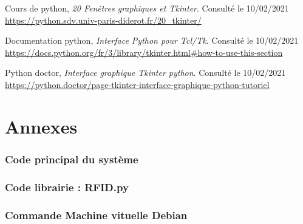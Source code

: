 \documentclass[a4paper]{report}
\begin{document}
\begin{thebibliography}{9}
        \bibitem{}\label{bib:multicore_pico}
            Cours de python,
            \emph{20 Fenêtres graphiques et Tkinter}. \newline
            Consulté le 10/02/2021\\
            \url{https://python.sdv.univ-paris-diderot.fr/20_tkinter/}

        \bibitem{}\label{bib:multicore_pico}
            Documentation python,
            \emph{Interface Python pour Tcl/Tk}. \newline
            Consulté le 10/02/2021 \\
            \url{https://docs.python.org/fr/3/library/tkinter.html#how-to-use-this-section}

        \bibitem{}\label{bib:multicore_pico}
            Python doctor,
            \emph{Interface graphique Tkinter python}. \newline
            Consulté le 10/02/2021 \\
            \url{https://python.doctor/page-tkinter-interface-graphique-python-tutoriel}
    \end{thebibliography}






    \appendix{}
    
    \part{Annexes}
    
        \section{Code principal du système}
        \section{Code librairie : RFID.py}
        
        \section{Commande Machine vituelle Debian} \label{sec:cde machine virtuelle}
\end{document}
